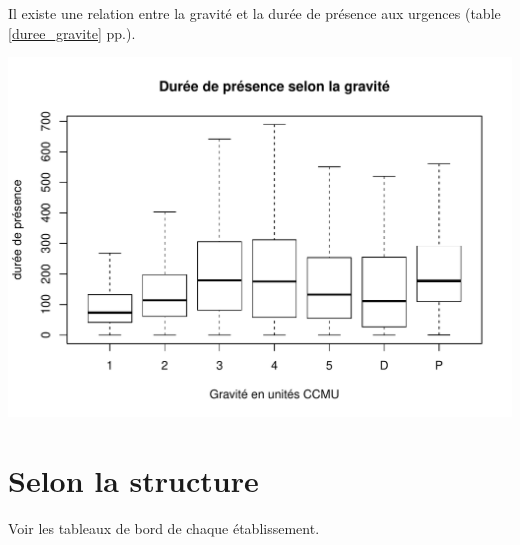 \documentclass[12pt,english,french,twoside]{book}\usepackage[]{graphicx}\usepackage[]{color}
\makeatletter
\def\maxwidth{ %
  \ifdim\Gin@nat@width>\linewidth
    \linewidth
  \else
    \Gin@nat@width
  \fi
}
\newenvironment{knitrout}{}{} %
\makeatother
\begin{document}
Il existe une relation entre la gravité et la durée de présence aux urgences (table \ref{duree_gravite} pp.\pageref{duree_gravite}).

 \begin{center}
\begin{knitrout}
\color{fgcolor}
\includegraphics[width=\maxwidth]{figure/duree_gravite2-1} 

\end{knitrout}
 \label{toucan}
\end{center}



\section{Selon la structure}

Voir les tableaux de bord de chaque établissement.

% 
% 
% 
% 
% 
\end{document}
